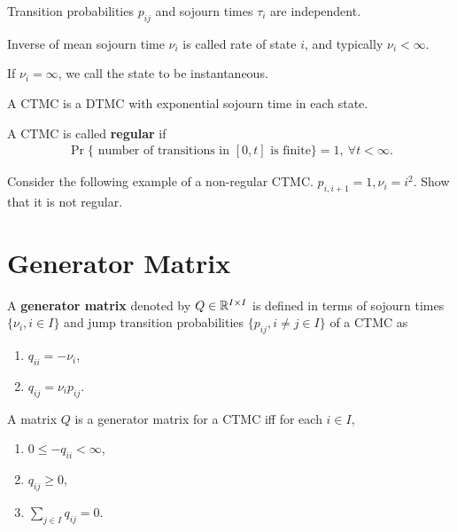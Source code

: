 \documentclass[a4paper,10pt,english]{article}
\begin{document}
\begin{rem}
Transition probabilities $p_{ij}$ and sojourn times $\tau_i$ are independent. 
\end{rem}
\begin{rem} Inverse of mean sojourn time $\nu_i$ is called rate of state $i$, and typically $\nu_i < \infty$.  
\end{rem}
\begin{rem} If $\nu_i = \infty$, we call the state to be instantaneous. 
\end{rem}
\begin{rem}  A CTMC is a DTMC with exponential sojourn time in each state.
\end{rem}
\begin{defn} A CTMC is called \textbf{regular} if 
\begin{align*}
\Pr\{ \text{ number of transitions in } [0,t] \text{ is finite}\} = 1,~ \forall t < \infty.
\end{align*} 
\end{defn}
\begin{exmp} Consider the following example of a non-regular CTMC. $p_{i,i+1}=1, \nu_i = i^2$. Show that it is not regular.
\end{exmp}

\section{Generator Matrix}
\begin{defn}
A \textbf{generator matrix} denoted by $Q \in \mathbb{R}^{I \times I}$ is defined in terms of sojourn times $\{\nu_i, i \in I\}$ and jump transition probabilities $\{p_{ij}, i \neq j \in I\}$ of a CTMC as
\begin{enumerate}
\item $q_{ii}= -\nu_i$,
\item $q_{ij}=\nu_i p_{ij}$. 
\end{enumerate}
\end{defn}
\begin{lem} A matrix $Q$ is a generator matrix for a CTMC iff for each $i \in I$,
 \begin{enumerate}
\item $0 \leq -q_{ii} < \infty$, 
\item $q_{ij} \geq 0$,
\item $\sum_{j \in I}q_{ij}=0$.
\end{enumerate}
\end{lem}
\end{document}
